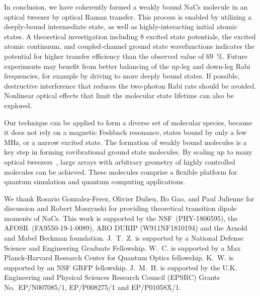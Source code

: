 \documentclass[aps,prl,twocolumn,10pt,superscriptaddress]{revtex4-1}
\newcommand{\todo}[1]{}
\begin{document}
In conclusion, we have coherently formed a weakly bound NaCs molecule in an optical tweezer
by optical Raman transfer.  This process is enabled by utilizing a deeply-bound intermediate state, as well as highly-interacting initial atomic states.  A theoretical investigation including 8 excited state potentials,
the excited atomic continuum, and coupled-channel ground state wavefunctions indicates
the potential for higher transfer efficiency than the observed value of $69$~\%.  Future experiments may benefit from better balancing of the up-leg and down-leg Rabi frequencies, for example by driving to more deeply bound states.  If possible, destructive interference that reduces the two-photon Rabi rate should be avoided.  Nonlinear optical effects that limit the molecular state lifetime can also be explored.

Our technique can be applied to form a diverse set of molecular species,
because it does not rely on a magnetic Feshbach resonance, states bound by only a few MHz,
or a narrow excited state. The formation of weakly bound molecules is a key step
in forming rovibrational ground state molecules. By scaling up to many optical tweezers~\cite{Endres2016, Barredo2018,  PhysRevLett.122.203601}, large arrays with arbitrary geometry of highly controlled molecules can be achieved. These molecules comprise a flexible platform for quantum simulation and quantum computing applications. %

\todo{sm: STIRAP vs Raman}

\begin{acknowledgments}
  We thank Rosario Gonzalez-Ferez, Olivier Dulieu, Bo Gao, and Paul Julienne for discussion and Robert Moszynski for providing theoretical transition dipole moments of NaCs. This work is supported by the NSF~(PHY-1806595), the AFOSR~(FA9550-19-1-0089), ARO DURIP (W911NF1810194) and the Arnold and Mabel Beckman foundation. J.~T.~Z. is supported by a National Defense Science and Engineering Graduate Fellowship. W.~C. is supported by a Max Planck-Harvard Research Center for Quantum Optics fellowship. K.~W. is supported by an NSF GRFP fellowship. J.~M.~H. is supported by the U.K. Engineering and Physical Sciences Research Council (EPSRC) Grants No.\ EP/N007085/1, EP/P008275/1 and EP/P01058X/1.
\end{acknowledgments}
\end{document}
